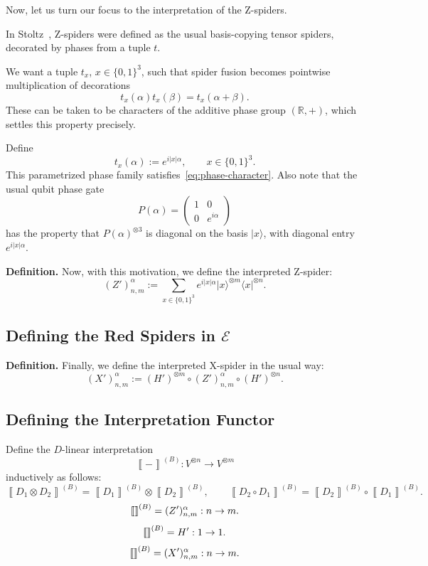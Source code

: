 \documentclass[copyright,creativecommons]{eptcs}
\newcommand{\typedfig}[1]{\IfFileExists{latex_typed/b_rule_note/figures/#1.tikz}{}{}}
\newcommand{\zxfig}[1]{\vcenter{\hbox{\scalebox{1}{\typedfig{#1}}}}}
\newcommand{\sem}[1]{\left\llbracket #1 \right\rrbracket}
\theoremstyle{definition}
\theoremstyle{remark}
\begin{document}
Now, let us turn our focus to the interpretation of the Z-spiders.

In Stoltz~\cite{stoltz2026simplified}, Z-spiders were defined as the usual basis-copying tensor spiders, decorated by phases from a tuple \(t\).

We want a tuple \(t_x\), \(x\in\{0,1\}^3\), such that spider fusion becomes pointwise multiplication of decorations
\begin{equation}
\label{eq:phase-character}
 t_x(\alpha)t_x(\beta)=t_x(\alpha+\beta).
\end{equation}
These can be taken to be characters of the additive phase group \((\mathbb R,+)\), which settles this property precisely.

Define
\[
t_x(\alpha):=e^{i\lvert x\rvert\alpha},
\qquad x\in\{0,1\}^3.
\]
This parametrized phase family satisfies~\eqref{eq:phase-character}.
Also note that the usual qubit phase gate
\[
P(\alpha)=
\begin{pmatrix}
1&0\\
0&e^{i\alpha}
\end{pmatrix}
\]
has the property that \(P(\alpha)^{\otimes 3}\) is diagonal on the basis \(\lvert x\rangle\), with diagonal entry \(e^{i\lvert x\rvert\alpha}\).

\noindent\textbf{Definition.} Now, with this motivation, we define the interpreted Z-spider:
\[
(Z')^\alpha_{n,m}
:=
\sum_{x\in\{0,1\}^3}
e^{i\lvert x\rvert\alpha}
\lvert x\rangle^{\otimes m}
\langle x\rvert^{\otimes n}.
\]

\subsection{Defining the Red Spiders in \texorpdfstring{\(\mathcal E\)}{E}}
\label{sec:defining-red-spiders-e}

\noindent\textbf{Definition.} Finally, we define the interpreted X-spider in the usual way:
\[
 (X')^\alpha_{n,m}:=(H')^{\otimes m}\circ (Z')^\alpha_{n,m}\circ (H')^{\otimes n}.
\]

\subsection{Defining the Interpretation Functor}
\label{sec:defining-interpretation-functor}

Define the \(D\)-linear interpretation
\[
\sem{-}^{(B)}:V^{\otimes n}\longrightarrow V^{\otimes m}
\]
inductively as follows:
\[
\sem{D_1\otimes D_2}^{(B)}=\sem{D_1}^{(B)}\otimes \sem{D_2}^{(B)},
\qquad
\sem{D_2\circ D_1}^{(B)}=\sem{D_2}^{(B)}\circ \sem{D_1}^{(B)}.
\]
\[
\sem{\zxfig{gn-alpha}}^{(B)}
= (Z')^\alpha_{n,m}:n\to m.
\]
\[
\sem{\zxfig{Hadamard}}^{(B)}=H':1\to1.
\]
\[
\sem{\zxfig{rn-alpha}}^{(B)}
= (X')^\alpha_{n,m}:n\to m.
\]
\end{document}
